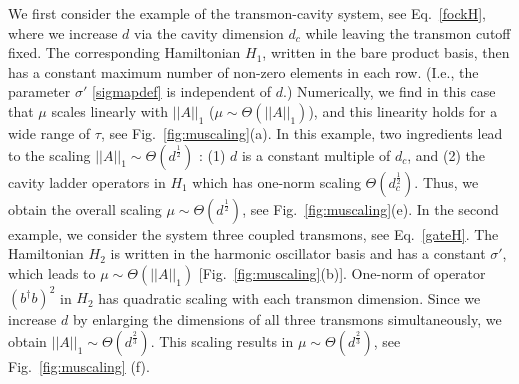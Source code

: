 \documentclass[letterpaper,10pt]{iopart}
\newcommand{\norm}[1]{\left|\left|#1\right|\right|}
\begin{document}
We first consider the example of the transmon-cavity system, see Eq.\ \eqref{fockH}, where we increase $d$ via the cavity dimension $d_c$ while leaving the transmon cutoff fixed. The corresponding Hamiltonian $H_1$, written in the bare product basis, then has a constant maximum number of non-zero elements in each row. (I.e., the parameter $\sigma'$ \eqref{sigmapdef} is independent of $d$.) Numerically, we find in this case that $\mu$ scales linearly with $\norm{A}_1$ \big($\mu\sim\Theta(\norm{A}_1)$\big), and this linearity holds for a wide range of $\tau$, see Fig.\ \ref{fig:muscaling}(a). In this example, two ingredients lead to the scaling $\norm{A}_1\sim \Theta(d^{\frac{1}{2}})$ : (1) $d$ is a constant multiple of $d_c$, and (2) the cavity ladder operators in $H_1$ which has one-norm scaling $\Theta(d_c^\frac{1}{2})$. Thus, we obtain the overall scaling $\mu\sim \Theta(d^{\frac{1}{2}})$, see Fig.\ \ref{fig:muscaling}(e). In the second example, we consider the system three coupled transmons, see Eq.\ \eqref{gateH}. The Hamiltonian $H_2$ is written in the harmonic oscillator basis and has a constant $\sigma'$, which leads to $\mu\sim\Theta(\norm{A}_1)$ [Fig.\ \ref{fig:muscaling}(b)]. One-norm of operator $(b^\dagger b)^2$ in $H_2$ has quadratic scaling with each transmon dimension. Since we increase $d$ by enlarging the dimensions of all three transmons simultaneously, we obtain $\norm{A}_1\sim\Theta(d^{\frac{2}{3}})$. This scaling results in $\mu\sim \Theta(d^{\frac{2}{3}})$, see Fig.\ \ref{fig:muscaling} (f).
\end{document}

